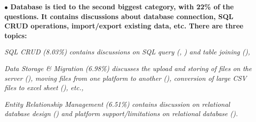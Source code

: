 

\nd\bf{$\bullet$ Database} is tied to the second biggest category, with 22\% of the questions. It contains discussions about database connection, SQL CRUD
operations, import/export existing data, etc. There are three topics:
\begin{inparaenum}[(1)] 
    \item \it{SQL CRUD (8.03\%)} contains discussions on SQL
        query (, ) and table joining (), 
    \item \it{Data Storage \& Migration (6.98\%)} discusses the upload
        and storing of files on the server (), moving files from one platform
        to another (), conversion of large CSV files to excel sheet
        (), etc., 
    \item \it{Entity Relationship Management (6.51\%)} contains discussion on
        relational database design  () and platform support/limitations
        on relational database ().
\end{inparaenum} 

